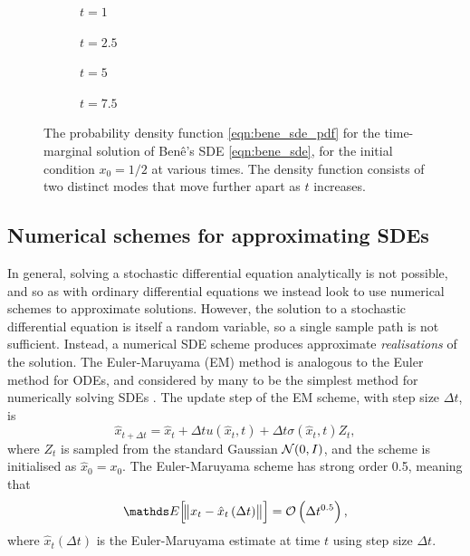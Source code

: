 \begin{figure}
	\begin{center}
		\begin{subfigure}{0.49\textwidth}
			\caption{\(t = 1\)}
			\label{fig:bene_1}
		\end{subfigure}
		\begin{subfigure}{0.49\textwidth}
			\caption{\(t = 2.5\)}
			\label{fig:bene_2.5}
		\end{subfigure}
		\begin{subfigure}{0.49\textwidth}
			\caption{\(t = 5\)}
			\label{fig:bene_5}
		\end{subfigure}
		\begin{subfigure}{0.49\textwidth}
			\caption{\(t = 7.5\)}
			\label{fig:bene_7.5}
		\end{subfigure}
	\end{center}
	\caption{The probability density function \eqref{eqn:bene_sde_pdf} for the time-marginal solution of Ben\^e's SDE \eqref{eqn:bene_sde}, for the initial condition \(x_0 = 1/2\) at various times.
		The density function consists of two distinct modes that move further apart as \(t\) increases.}
	\label{fig:bene_pdf}
\end{figure}




\subsection{Numerical schemes for approximating SDEs}
In general, solving a stochastic differential equation analytically is not possible, and so as with ordinary differential equations we instead look to use numerical schemes to approximate solutions.
However, the solution to a stochastic differential equation is itself a random variable, so a single sample path is not sufficient.
Instead, a numerical SDE scheme produces approximate \emph{realisations} of the solution.
The Euler-Maruyama (EM) method is analogous to the Euler method for ODEs, and considered by many to be the simplest method for numerically solving SDEs \citep{KloedenPlaten_1992_NumericalSolutionStochastic}.
The update step of the EM scheme, with step size \(\Delta t\), is
\begin{equation}
	\hat{x}_{t + \Delta t} = \hat{x}_{t} + \Delta t u\left(\hat{x}_t, t\right) + \Delta t \sigma\left(\hat{x}_t, t\right) Z_t,
	\label{eqn:em_step}
\end{equation}
where \(Z_t\) is sampled from the standard Gaussian \(\mathcal{N}\!\left(0,I\right)\), and the scheme is initialised as \(\hat{x}_0 = x_0\).
The Euler-Maruyama scheme has strong order 0.5, meaning that
\[
	\avg{\norm{x_t - \hat{x}_{t}\left(\Delta t\right)}} = \mathcal{O}\left(\Delta t^{0.5}\right),
\]
where \(\hat{x}_t\left(\Delta t\right)\) is the Euler-Maruyama estimate at time \(t\) using step size \(\Delta t\).


